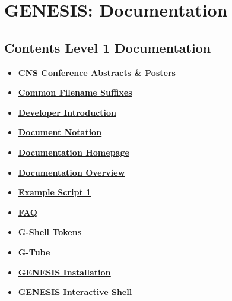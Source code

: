 \documentclass[12pt]{article}
\begin{document}
\section*{GENESIS: Documentation}

\subsection*{Contents Level 1 Documentation}

\begin{itemize}

\item \href{../cns/cns.pdf}{\bf \underline{CNS Conference Abstracts & Posters}}

\item \href{../common-suffixes/common-suffixes.pdf}{\bf \underline{Common Filename Suffixes}}

\item \href{../developer-intro/developer-intro.pdf}{\bf \underline{Developer Introduction}}

\item \href{../document-notation/document-notation.pdf}{\bf \underline{Document Notation}}

\item \href{../documentation-homepage/documentation-homepage.pdf}{\bf \underline{Documentation Homepage}}

\item \href{../documentation-overview/documentation-overview.pdf}{\bf \underline{Documentation Overview}}

\item \href{../example-script1/example-script1.pdf}{\bf \underline{Example Script 1}}

\item \href{../faq/faq.pdf}{\bf \underline{FAQ}}

\item \href{../shell-tokens/shell-tokens.pdf}{\bf \underline{G-Shell Tokens}}

\item \href{../gtube/gtube.pdf}{\bf \underline{G-Tube}}

\item \href{../genesis-installation/genesis-installation.pdf}{\bf \underline{GENESIS Installation}}

\item \href{../gshell/gshell.pdf}{\bf \underline{GENESIS Interactive Shell}}


\end{itemize}
\end{document}
